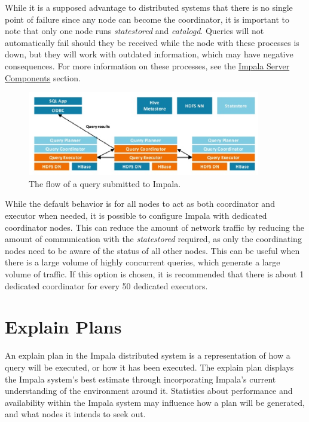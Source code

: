 \documentclass[onecolumn, draftclsnofoot,10pt, compsoc]{IEEEtran}
\begin{document}
While it is a supposed advantage to distributed systems that there is no single point of failure since any node can become the coordinator, it is important to note that only one node runs \textit{statestored} and \textit{catalogd}.
Queries will not automatically fail should they be received while the node with these processes is down, but they will work with outdated information, which may have negative consequences. 
For more information on these processes, see the \hyperref[sec:impservcomp]{Impala Server Components} section.

\begin{figure}[ht]
    \begin{center}
    \includegraphics[width=4in, keepaspectratio]{qcc.eps}
    \caption{The flow of a query submitted to Impala. \cite{IncrImp}}
    \end{center}
\end{figure}

While the default behavior is for all nodes to act as both coordinator and executor when needed, it is possible to configure Impala with dedicated coordinator nodes.
This can reduce the amount of network traffic by reducing the amount of communication with the \textit{statestored} required, as only the coordinating nodes need to be aware of the status of all other nodes. 
This can be useful when there is a large volume of highly concurrent queries, which generate a large volume of traffic. 
If this option is chosen, it is recommended that there is about 1 dedicated coordinator for every 50 dedicated executors. 

\section{Explain Plans}
%
An explain plan in the Impala distributed system is a representation of how a query will be executed, or how it has been executed. The explain plan displays the Impala system's best estimate through incorporating Impala's current understanding of the environment around it. Statistics about performance and availability within the Impala system may influence how a plan will be generated, and what nodes it intends to seek out. 
\end{document}
